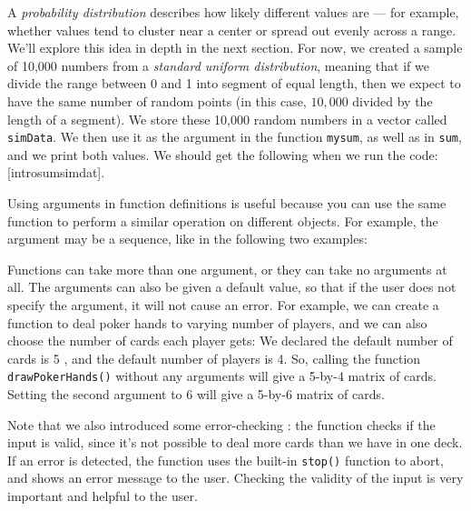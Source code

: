 A \emph{probability distribution} describes how likely different values are --- for example, whether values tend to cluster near a center or spread out evenly across a range. We'll explore this idea in depth in the next section. For now, we created a sample of 10,000 numbers from a \emph{standard uniform distribution},
meaning that if we divide the range between 0 and 1 into
segment of equal length, then we expect to 
have the same number of random points (in this case, $10,000$ divided by the length of
a segment).
We store these 10,000 random numbers in a vector called \lstinline{simData}.
We then use it as the argument in the function \lstinline{mysum}, as well as in
\lstinline{sum}, and we print both values.
We should get the following when we run the code: 
[introsumsimdat].


Using arguments in function definitions is useful because you can use the
same function to perform a similar operation on different objects. For example,
the argument may be a sequence, like in the following two examples:


Functions can take more than one argument, or they can take no arguments at all.
The arguments can also be given a default value, so that if the user does not
specify the argument, it will not cause an error. For example, we can create a
function to deal poker hands to varying number of players, and we can also
choose the number of cards each player gets:
We declared the default number of cards is 5 , and the default number
of players is 4. So, calling the function \lstinline{drawPokerHands()} without any
arguments will give a 5-by-4 matrix of cards. Setting the second argument to 6 will
give a 5-by-6 matrix of cards.


Note that we also introduced some error-checking : the function checks
if the input is valid, since it's not possible to deal more cards than we have in one deck.
If an error is detected, the function uses the built-in \lstinline{stop()} function to abort,
and shows an error message to the user.  Checking the validity of the input is very
important and helpful to the user.

